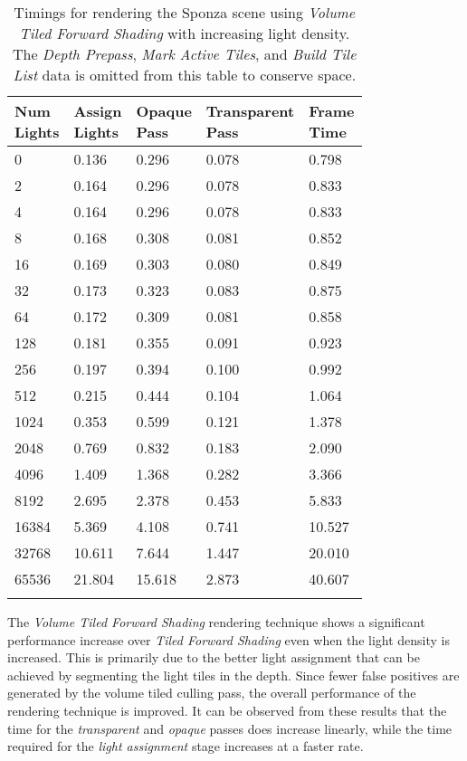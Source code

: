 \begin{table}[H]
\caption{Timings for rendering the Sponza scene using \emph{Volume Tiled Forward Shading} with increasing light density. The \emph{Depth Prepass}, \emph{Mark Active Tiles}, and \emph{Build Tile List} data is omitted from this table to conserve space. }
\label{tab:VolumeTiledForward_1920x1080_Sponza}
\centering
\begin{tabular}{*{5}{l}}
\toprule
\thead{Num \\Lights} & \thead{Assign \\Lights} & \thead{Opaque \\Pass} & \thead{Transparent \\Pass} & \thead{Frame \\Time } \\
\midrule
0 & 0.136 & 0.296 & 0.078 & 0.798 \\
2 & 0.164 & 0.296 & 0.078 & 0.833 \\
4 & 0.164 & 0.296 & 0.078 & 0.833 \\
8 & 0.168 & 0.308 & 0.081 & 0.852 \\
16 & 0.169 & 0.303 & 0.080 & 0.849 \\
32 & 0.173 & 0.323 & 0.083 & 0.875 \\
64 & 0.172 & 0.309 & 0.081 & 0.858 \\
128 & 0.181 & 0.355 & 0.091 & 0.923 \\
256 & 0.197 & 0.394 & 0.100 & 0.992 \\
512 & 0.215 & 0.444 & 0.104 & 1.064 \\
1024 & 0.353 & 0.599 & 0.121 & 1.378 \\
2048 & 0.769 & 0.832 & 0.183 & 2.090 \\
4096 & 1.409 & 1.368 & 0.282 & 3.366 \\
8192 & 2.695 & 2.378 & 0.453 & 5.833 \\
16384 & 5.369 & 4.108 & 0.741 & 10.527 \\
32768 & 10.611 & 7.644 & 1.447 & 20.010 \\
65536 & 21.804 & 15.618 & 2.873 & 40.607 \\
\bottomrule\\
\end{tabular}
\end{table}

The \emph{Volume Tiled Forward Shading} rendering technique shows a significant performance increase over \emph{Tiled Forward Shading} even when the light density is increased. This is primarily due to the better light assignment that can be achieved by segmenting the light tiles in the depth. Since fewer false positives are generated by the volume tiled culling pass, the overall performance of the rendering technique is improved. It can be observed from these results that the time for the \emph{transparent} and \emph{opaque} passes does increase linearly, while the time required for the \emph{light assignment} stage increases at a faster rate.


